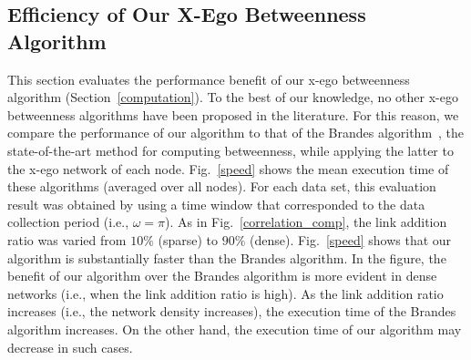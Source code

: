 \subsection{Efficiency of Our X-Ego Betweenness Algorithm}\label{efficiency}
This section evaluates the performance benefit of our x-ego betweenness algorithm (Section~\ref{computation}).
To the best of our knowledge, no other x-ego betweenness algorithms have been proposed in the literature.
For this reason, we compare the performance of our algorithm to that of the Brandes algorithm~\cite{Brandes01afaster}, the state-of-the-art method for computing betweenness, while applying the latter to the x-ego network of each node. 
Fig.~\ref{speed} shows the mean execution time of these algorithms (averaged over all nodes).
For each data set, this evaluation result was obtained by using a time window that corresponded to the data collection period (i.e., $\omega=\pi$). 
As in Fig.~\ref{correlation_comp}, the link addition ratio was varied from $10\%$ (sparse) to $90\%$ (dense).
Fig.~\ref{speed} shows that our algorithm is substantially faster than the Brandes algorithm.
In the figure, the benefit of our algorithm over the Brandes algorithm is more evident in dense networks (i.e., when the link addition ratio is high).
As the link addition ratio increases (i.e., the network density increases), the execution time of the Brandes algorithm increases.
On the other hand, the execution time of our algorithm may decrease in such cases.

